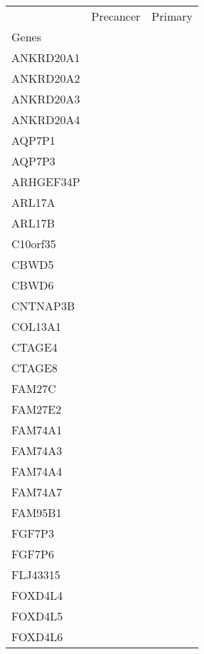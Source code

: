 \begin{tabular}{lcc}
\toprule
{} & Precancer & Primary \\
Genes              &           &         \\
\midrule
ANKRD20A1          &           &         \\
ANKRD20A2          &           &         \\
ANKRD20A3          &           &         \\
ANKRD20A4          &           &         \\
AQP7P1             &           &         \\
AQP7P3             &           &         \\
ARHGEF34P          &           &         \\
ARL17A             &           &         \\
ARL17B             &           &         \\
C10orf35           &           &         \\
CBWD5              &           &         \\
CBWD6              &           &         \\
CNTNAP3B           &           &         \\
COL13A1            &           &         \\
CTAGE4             &           &         \\
CTAGE8             &           &         \\
FAM27C             &           &         \\
FAM27E2            &           &         \\
FAM74A1            &           &         \\
FAM74A3            &           &         \\
FAM74A4            &           &         \\
FAM74A7            &           &         \\
FAM95B1            &           &         \\
FGF7P3             &           &         \\
FGF7P6             &           &         \\
FLJ43315           &           &         \\
FOXD4L4            &           &         \\
FOXD4L5            &           &         \\
FOXD4L6            &           &         \\

\end{tabular}
